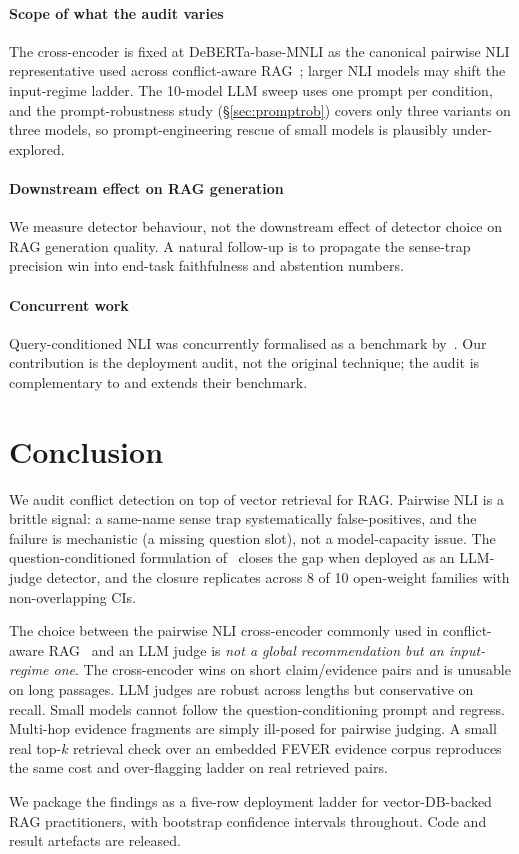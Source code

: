 \documentclass[sigconf, nonacm, natbib]{acmart}
\begin{document}
\paragraph{Scope of what the audit varies}
The cross-encoder is fixed at DeBERTa-base-MNLI as the canonical pairwise NLI
representative used across conflict-aware
RAG~\citep{conflictrag2025,madamrag2025,contradetect2025}; larger NLI models may shift
the input-regime ladder. The 10-model LLM sweep uses one prompt per condition, and the
prompt-robustness study (\S\ref{sec:promptrob}) covers only three variants on three
models, so prompt-engineering rescue of small models is plausibly under-explored.

\paragraph{Downstream effect on RAG generation}
We measure detector behaviour, not the downstream effect of detector choice on RAG
generation quality. A natural follow-up is to propagate the sense-trap precision win
into end-task faithfulness and abstention numbers.

\paragraph{Concurrent work}
Query-conditioned NLI was concurrently formalised as a benchmark by~\citet{canby2025qnli}.
Our contribution is the deployment audit, not the original technique; the audit is
complementary to and extends their benchmark.

\section{Conclusion}
\label{sec:conclusion}
We audit conflict detection on top of vector retrieval for RAG. Pairwise NLI is a
brittle signal: a same-name sense trap systematically false-positives, and the failure
is mechanistic (a missing question slot), not a model-capacity issue. The
question-conditioned formulation of~\citet{canby2025qnli} closes the gap when deployed
as an LLM-judge detector, and the closure replicates across 8 of 10 open-weight
families with non-overlapping CIs.

The choice between the pairwise NLI cross-encoder commonly used in conflict-aware
RAG~\citep{conflictrag2025,madamrag2025,contradetect2025} and an LLM judge is
\emph{not a global recommendation but an input-regime one}. The cross-encoder wins on
short claim/evidence pairs and is unusable on long passages. LLM judges are robust
across lengths but conservative on recall. Small models cannot follow the
question-conditioning prompt and regress. Multi-hop evidence fragments are simply
ill-posed for pairwise judging. A small real top-$k$ retrieval check over an embedded
FEVER evidence corpus reproduces the same cost and over-flagging ladder on real
retrieved pairs.

We package the findings as a five-row deployment ladder for vector-DB-backed RAG
practitioners, with bootstrap confidence intervals throughout. Code and result
artefacts are released.



\end{document}
